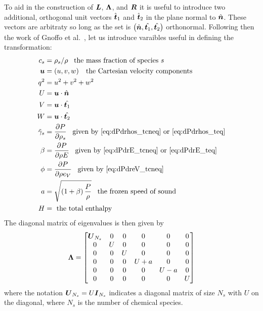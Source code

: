 To aid in the construction of ${\boldsymbol{L}}$, ${\boldsymbol{\Lambda}}$, and ${\boldsymbol{R}}$ it is useful to introduce two additional, orthogonal unit vectors $\hat{{\boldsymbol{t}}}_1$ and $\hat{{\boldsymbol{t}}}_2$ in the plane normal to $\hat{{\boldsymbol{n}}}$.  These vectors are arbitraty so long as the set is $\left(\hat{{\boldsymbol{n}}},\hat{{\boldsymbol{t}}_1},\hat{{\boldsymbol{t}}_2}\right)$ orthonormal.  Following then the work of Gnoffo et al.~\cite{gnoffo_conservation_laws}, let us introduce varaibles useful in defining the transformation:
\begin{align*}
  c_s &= \rho_s/\rho\;\;\;\mbox{the mass fraction of species $s$} \\
  {\boldsymbol{u}} &= \left(u,v,w\right)\;\;\;\mbox{the Cartesian velocity components} \\
  q^2 &= u^2+v^2+w^2 \\
  U &= {\boldsymbol{u}}\cdot\hat{{\boldsymbol{n}}} \\
  V &= {\boldsymbol{u}}\cdot\hat{{\boldsymbol{t}}_1} \\
  W &= {\boldsymbol{u}}\cdot\hat{{\boldsymbol{t}}_2}  \\
  \tilde{\gamma}_s &= {\frac{\partial{P}}{\partial{\rho_s}}}\;\;\;\mbox{given by~\eqref{eq:dPdrhos_tcneq} or~\eqref{eq:dPdrhos_teq}} \\
  \beta &= {\frac{\partial{P}}{\partial{\rho E}}}\;\;\;\mbox{given by~\eqref{eq:dPdrE_tcneq} or~\eqref{eq:dPdrE_teq}} \\
  \phi &= {\frac{\partial{P}}{\partial{\rho e_V}}}\;\;\;\mbox{given by~\eqref{eq:dPdreV_tcneq}} \\
  a &= \sqrt{\left(1 + \beta\right)\frac{P}{\rho}}\;\;\;\mbox{the frozen speed of sound} \\
  H &= \mbox{ the total enthalpy}
\end{align*}
The diagonal matrix of eigenvalues is then given by
\begin{equation}
{\boldsymbol{\Lambda}} =
\begin{bmatrix}
  {\boldsymbol{U}}_{N_s} & 0 & 0 & 0   & 0 & 0 \\
      0 & U & 0 & 0   & 0 & 0 \\
      0 & 0 & U & 0   & 0 & 0 \\
      0 & 0 & 0 & U+a & 0 & 0 \\
      0 & 0 & 0 & 0   & U-a & 0 \\
      0 & 0 & 0 & 0   & 0   & U
\end{bmatrix}
\end{equation}
where the notation ${\boldsymbol{U}}_{N_s}=U{\boldsymbol{I}}_{N_s}$ indicates a diagonal matrix of size $N_s$ with $U$ on the diagonal, where $N_s$ is the number of chemical species.

